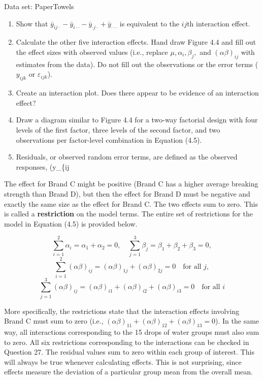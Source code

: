 \documentclass[
]{report}
\begin{document}
Data set: PaperTowels

\begin{enumerate}
\def\labelenumi{\arabic{enumi}.}
\setcounter{enumi}{25}
\item
  Show that \(\bar y_{ij\cdot} - \bar y_{i\cdot\cdot} - \bar y_{\cdot j\cdot} + \bar y_{\cdot\cdot\cdot}\) is equivalent to the \(ij\)th interaction effect.
\item
  Calculate the other five interaction effects. Hand draw Figure 4.4 and fill out the effect sizes with observed values (i.e., replace \(\mu, \alpha_i, \beta_j,\) and \((\alpha\beta)_{ij}\) with estimates from the data). Do not fill out the observations or the error terms (\(y_{ijk}\) or \(\varepsilon_{ijk}\)).
\item
  Create an interaction plot. Does there appear to be evidence of an interaction effect?
\item
  Draw a diagram similar to Figure 4.4 for a two-way factorial design with four levels of the first factor, three levels of the second factor, and two observations per factor-level combination in Equation (4.5).
\item
  Residuals, or observed random error terms, are defined as the observed responses, (y\_\{ij
\end{enumerate}

The effect for Brand C might be positive (Brand C has a higher average breaking strength than Brand D), but then the effect for Brand D must be negative and exactly the same size as the effect for Brand C. The two effects sum to zero. This is called a \textbf{restriction} on the model terms. The entire set of restrictions for the model in Equation (4.5) is provided below.

\[
\sum_{i=1}^2 \alpha_i = \alpha_1 + \alpha_2 = 0,
\quad
\sum_{j=1}^3 \beta_j = \beta_1 + \beta_2 + \beta_3 = 0,
\]
\[
\sum_{i=1}^2 (\alpha\beta)_{ij} = (\alpha\beta)_{1j} + (\alpha\beta)_{2j} = 0
\quad\text{for all } j,
\]
\[
\sum_{j=1}^3 (\alpha\beta)_{ij} = (\alpha\beta)_{i1} + (\alpha\beta)_{i2} + (\alpha\beta)_{i3} = 0
\quad\text{for all } i
\tag{4.8}
\]

More specifically, the restrictions state that the interaction effects involving Brand C must sum to zero
(i.e., \((\alpha\beta)_{11} + (\alpha\beta)_{12} + (\alpha\beta)_{13} = 0\)).
In the same way, all interactions corresponding to the 15 drops of
water groups must also sum to zero. All six restrictions corresponding to the interactions can be checked in
Question 27. The residual values sum to zero within each group of interest. This will always be true whenever
calculating effects. This is not surprising, since effects measure the deviation of a particular group mean from
the overall mean.
\end{document}
